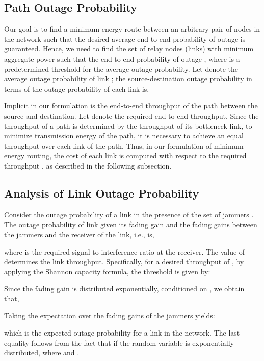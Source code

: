\documentclass[10pt,journal]{IEEEtran}
\theoremstyle{definition}
\begin{document}
\subsection{Path Outage Probability}
Our goal is to find a minimum energy route  between  an arbitrary pair of nodes in the network  such that the desired average end-to-end  probability of outage is guaranteed.  
Hence, we need to find the set of relay nodes (links) with minimum aggregate power such that the end-to-end probability of outage , where  is a predetermined threshold for the average outage  probability.
Let  denote the average outage probability of link ; the source-destination outage probability in terms of the outage probability of each link is,

Implicit in our formulation is the end-to-end throughput of the path between the source and destination. Let  denote the required end-to-end throughput. Since the throughput of a path is determined by the throughput of its bottleneck link, to minimize transmission energy of the path, it is necessary to achieve an equal throughput over each link of the path. Thus, in our formulation of minimum energy routing, the cost of each link is computed with respect to the required throughput , as described in the following subsection.   
\subsection{Analysis of Link Outage Probability}\label{sec:outageprobability}
Consider the outage probability of a link in the presence of the set of  jammers . 
The outage probability of link  given its fading gain  and the fading gains  between the jammers and the receiver of the link, i.e.,   is,

where   is the required signal-to-interference ratio at the receiver. The value of  determines the link throughput. Specifically, for a desired throughput of , by applying the Shannon capacity formula, the threshold  is given by:

Since the fading gain  is distributed exponentially, conditioned on , we obtain that, 
\begin{small}

\end{small}
Taking the expectation over the fading gains of the jammers yields:
\begin{small}

\end{small}
which is the expected outage probability for a link in the network. 
The last equality follows from the fact that if the random variable   is exponentially distributed,  where   and .
\end{document}

